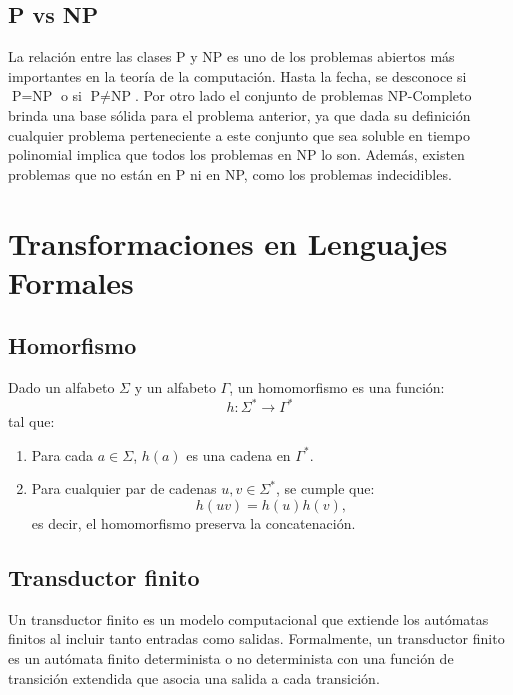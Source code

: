 \documentclass{article}
\begin{document}
\subsection{P vs NP}

La relación entre las clases P y NP es uno de los problemas abiertos más importantes en la teoría de la
computación. Hasta la fecha, se desconoce si $\text{P} = \text{NP}$ o si $\text{P} \neq \text{NP}$. Por otro
lado el conjunto de problemas NP-Completo brinda una base sólida para el problema anterior, ya que dada su
definición cualquier problema perteneciente a este conjunto que sea soluble en tiempo polinomial
implica que todos los problemas en NP lo son. Además, existen problemas que no están en P ni en NP, como
los problemas indecidibles.

\section{Transformaciones en Lenguajes Formales}

\subsection{Homorfismo}

Dado un alfabeto \( \Sigma \) y un alfabeto \( \Gamma \), un homomorfismo es una función:
\[
      h: \Sigma^* \to \Gamma^*
\]
tal que:
\begin{enumerate}
      \item Para cada \( a \in \Sigma \), \( h(a) \) es una cadena en \( \Gamma^* \).
      \item Para cualquier par de cadenas \( u, v \in \Sigma^* \), se cumple que:
            \[
                  h(uv) = h(u) h(v),
            \]
            es decir, el homomorfismo preserva la concatenación.
\end{enumerate}

\subsection{Transductor finito}

Un transductor finito es un modelo computacional que extiende los autómatas finitos al incluir tanto entradas como salidas.
Formalmente, un transductor finito es un autómata finito determinista o no determinista con una función de transición extendida
que asocia una salida a cada transición.
\end{document}
